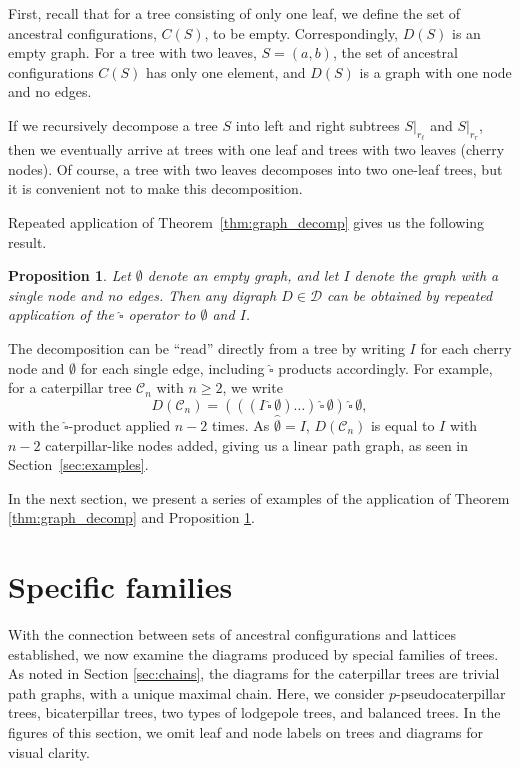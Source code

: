 \documentclass[10pt]{article}
\newcommand{\house}{\,\widehat{\square}\,}
\newtheorem{proposition}[theorem]{Proposition}
\begin{document}
First, recall that for a tree consisting of only one leaf, we define the set of ancestral configurations, $C(S)$, to be empty. Correspondingly, $D(S)$ is an empty graph. For a tree with two leaves, $S = (a,b)$, the set of ancestral configurations $C(S)$ has only one element, and $D(S)$ is a graph with one node and no edges. 

If we recursively decompose a tree $S$ into left and right subtrees $S|_{r_\ell}$ and $S|_{r_r}$, then we eventually arrive at trees with one leaf and trees with two leaves (cherry nodes). Of course, a tree with two leaves decomposes into two one-leaf trees, but it is convenient not to make this decomposition.

Repeated application of Theorem~\ref{thm:graph_decomp} gives us the following result.
\begin{proposition}\label{prop:D_desc}
	Let $\emptyset$ denote an empty graph, and let $I$ denote the graph with a single node and no edges. Then any digraph $D \in \mathcal D$ can be obtained by repeated application of the $\widehat\square$ operator to $\emptyset$ and $I$.
\end{proposition}
The decomposition can be ``read'' directly from a tree by writing $I$ for each cherry node and $\emptyset$ for each single edge, including $\widehat\square$ products accordingly. For example, for a caterpillar tree $\mathcal C_n$ with $n\geq 2$, we write 
\begin{equation}\label{eq:decomp_cat}
    D(\mathcal C_n) = (((I \house \emptyset) \ldots) \house \emptyset) \house \emptyset,
\end{equation}
with the $\widehat \square$-product applied $n-2$ times. As $\widehat{\emptyset} = I$, $D(\mathcal C_n)$ is equal to $I$ with $n-2$ caterpillar-like nodes added, giving us a linear path graph, as seen in Section~\ref{sec:examples}.

In the next section, we present a series of examples of the application of Theorem \ref{thm:graph_decomp} and Proposition \ref{prop:D_desc}.

\section{Specific families}\label{sec:families}

With the connection between sets of ancestral configurations and lattices established, we now examine the diagrams produced by special families of trees. As noted in Section \ref{sec:chains}, the diagrams for the caterpillar trees are trivial path graphs, with a unique maximal chain. Here, we consider $p$-pseudocaterpillar trees, bicaterpillar trees, two types of lodgepole trees, and balanced trees. In the figures of this section, we omit leaf and node labels on trees and diagrams for visual clarity.
\end{document}
